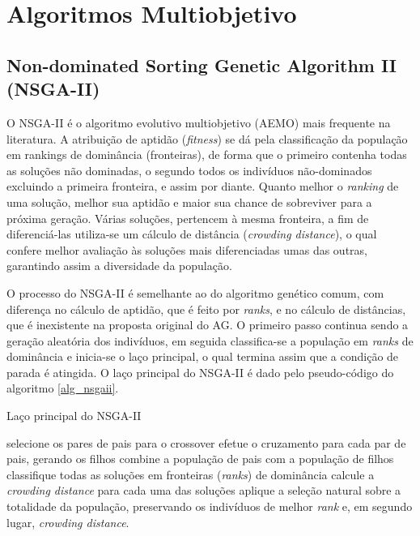 \section{Algoritmos Multiobjetivo}

\subsection{Non-dominated Sorting Genetic Algorithm II (NSGA-II)}
O NSGA-II \cite{Deb2002} é o algoritmo evolutivo multiobjetivo (AEMO) mais frequente na literatura. A atribuição de aptidão (\textit{fitness}) se dá pela classificação da população em rankings de dominância (fronteiras), de forma que o primeiro contenha todas as soluções não dominadas, o segundo todos os indivíduos não-dominados excluindo a primeira fronteira, e assim por diante. Quanto melhor o \textit{ranking} de uma solução, melhor sua aptidão e  maior sua chance de sobreviver para a próxima geração. Várias soluções, pertencem à mesma fronteira, a fim de diferenciá-las utiliza-se um cálculo de distância (\textit{crowding distance}), o qual confere melhor avaliação às soluções mais diferenciadas umas das outras, garantindo assim a diversidade da população.

O processo do NSGA-II é semelhante ao do algoritmo genético comum, com diferença no cálculo de aptidão, que é feito por \textit{ranks}, e no cálculo de distâncias, que é inexistente na proposta original do AG. O primeiro passo continua sendo a geração aleatória dos indivíduos, em seguida classifica-se a população em \textit{ranks} de dominância e inicia-se o laço principal, o qual termina assim que a condição de parada é atingida. O laço principal do NSGA-II é dado pelo pseudo-código do algoritmo \ref{alg_nsgaii}.

\begin{algorithm}
	\caption{Laço principal do NSGA-II}
	\label{alg_nsgaii}
	\begin{algorithmic}[1]
		\State selecione os pares de pais para o crossover
		\State efetue o cruzamento para cada par de pais, gerando os filhos
		\State combine a população de pais com a população de filhos
		\State classifique todas as soluções em fronteiras (\textit{ranks}) de dominância 
		\State calcule a \textit{crowding distance} para cada uma das soluções
		\State aplique a seleção natural sobre a totalidade da população, preservando os indivíduos de melhor \textit{rank} e, em segundo lugar, \textit{crowding distance}.
		\EndWhile
	\end{algorithmic}
\end{algorithm}

